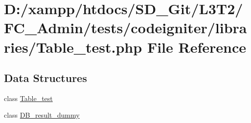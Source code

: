 \hypertarget{_admin_2tests_2codeigniter_2libraries_2_table__test_8php}{}\section{D\+:/xampp/htdocs/\+S\+D\+\_\+\+Git/\+L3\+T2/\+F\+C\+\_\+\+Admin/tests/codeigniter/libraries/\+Table\+\_\+test.php File Reference}
\label{_admin_2tests_2codeigniter_2libraries_2_table__test_8php}
\subsection*{Data Structures}
\begin{DoxyCompactItemize}
\item 
class \hyperlink{class_table__test}{Table\+\_\+test}
\item 
class \hyperlink{class_d_b__result__dummy}{D\+B\+\_\+result\+\_\+dummy}
\end{DoxyCompactItemize}
